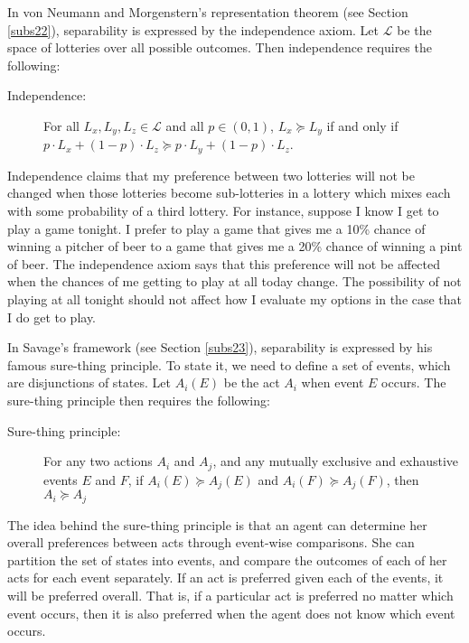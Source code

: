 In von Neumann and Morgenstern's representation theorem (see Section \ref{subs22}), separability is expressed by the independence axiom. Let $\mathscr{L}$ be the space of lotteries over all possible outcomes. Then independence requires the following:
\begin{description}
\item[Independence:] For all $L_x, L_y, L_z \in \mathscr{L}$ and all $p \in (0, 1)$, $L_x \succcurlyeq L_y$ if and only if $p \cdot L_x + (1 - p) \cdot L_z \succcurlyeq p \cdot L_y + (1 - p) \cdot L_z$.
\end{description}
Independence claims that my preference between two lotteries will not be changed when those lotteries become sub-lotteries in a lottery which mixes each with some probability of a third lottery. For instance, suppose I know I get to play a game tonight. I prefer to play a game that gives me a 10\% chance of winning a pitcher of beer to a game that gives me a 20\% chance of winning a pint of beer. The independence axiom says that this preference will not be affected when the chances of me getting to play at all today change. The possibility of not playing at all tonight should not affect how I evaluate my options in the case that I do get to play.

In Savage's framework (see Section \ref{subs23}), separability is expressed by his famous sure-thing principle. To state it, we need to define a set of events, which are disjunctions of states. Let $A_i (E)$ be the act $A_i$ when event $E$ occurs. The sure-thing principle then requires the following:
\begin{description}
\item[Sure-thing principle:] For any two actions $A_i$ and $A_j$, and any mutually exclusive and exhaustive events $E$ and $F$, if $A_i (E) \succcurlyeq A_j (E)$ and $A_i (F) \succcurlyeq A_j (F)$, then $A_i \succcurlyeq A_j$
\end{description}
The idea behind the sure-thing principle is that an agent can determine her overall preferences between acts through event-wise comparisons. She can partition the set of states into events, and compare the outcomes of each of her acts for each event separately. If an act is preferred given each of the events, it will be preferred overall. That is, if a particular act is preferred no matter which event occurs, then it is also preferred when the agent does not know which event occurs.

